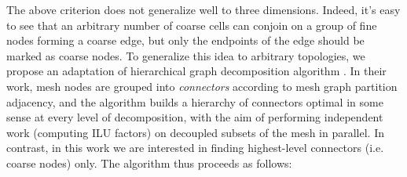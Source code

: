 The above criterion does not generalize well to three dimensions.   Indeed, it's easy to see that an arbitrary number of coarse cells can conjoin on a group of fine nodes forming a coarse edge, but only the endpoints of the edge should be marked as coarse nodes.   To generalize this idea to arbitrary topologies, we propose an adaptation of hierarchical graph decomposition algorithm \cite{Henon2006}.   In their work, mesh nodes are grouped into \textit{connectors} according to mesh graph partition adjacency, and the algorithm builds a hierarchy of connectors optimal in some sense at every level of decomposition, with the aim of performing independent work (computing ILU factors) on decoupled subsets of the mesh in parallel.   In contrast, in this work we are interested in finding highest-level connectors (i.e. coarse nodes) only.   The algorithm thus proceeds as follows:

